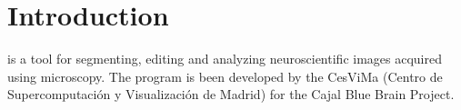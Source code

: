 \section{Introduction}

\espina{} is a tool for segmenting, editing and analyzing neuroscientific images acquired using microscopy.
The program is been developed by the CesViMa (Centro de Supercomputación y Visualización de Madrid)
for the Cajal Blue Brain Project.
